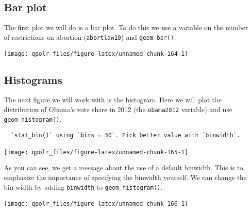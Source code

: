\documentclass[12pt,oneside]{reedthesis}
\theoremstyle{definition}
\theoremstyle{definition}
\theoremstyle{definition}
\theoremstyle{remark}
\begin{document}
  \subsection{Bar plot}\label{bar-plot}
  
  The first plot we will do is a bar plot. To do this we use a variable on
  the number of restrictions on abortion (\texttt{abortlaw10}) and
  \texttt{geom\_bar()}.
  \begin{Shaded}
  \begin{Highlighting}[]
  \NormalTok{(}\OperatorTok{+}
  \StringTok{  }\NormalTok{() }
  \end{Highlighting}
  \end{Shaded}
  \begin{center}\texttt{[image: qpolr\_files/figure-latex/unnamed-chunk-164-1]} \end{center}
  
  \subsection{Histograms}\label{histograms}
  
  The next figure we will work with is the histogram. Here we will plot
  the distribution of Obama's vote share in 2012 (the \texttt{obama2012}
  variable) and use \texttt{geom\_histogram()}.
  \begin{Shaded}
  \begin{Highlighting}[]
  \NormalTok{(}\OperatorTok{+}
  \StringTok{  }\NormalTok{() }
  \end{Highlighting}
  \end{Shaded}
  \begin{verbatim}
  `stat_bin()` using `bins = 30`. Pick better value with `binwidth`.
  \end{verbatim}
  \begin{center}\texttt{[image: qpolr\_files/figure-latex/unnamed-chunk-165-1]} \end{center}
  
  As you can see, we get a message about the use of a default binwidth.
  This is to emphasize the importance of specifying the binwidth yourself.
  We can change the bin width by adding \texttt{binwidth} to
  \texttt{geom\_histogram()}.
  \begin{Shaded}
  \begin{Highlighting}[]
  \NormalTok{(}\OperatorTok{+}
  \StringTok{  }\NormalTok{(} \NormalTok{)}
  \end{Highlighting}
  \end{Shaded}
  \begin{center}\texttt{[image: qpolr\_files/figure-latex/unnamed-chunk-166-1]} \end{center}
  
\end{document}
